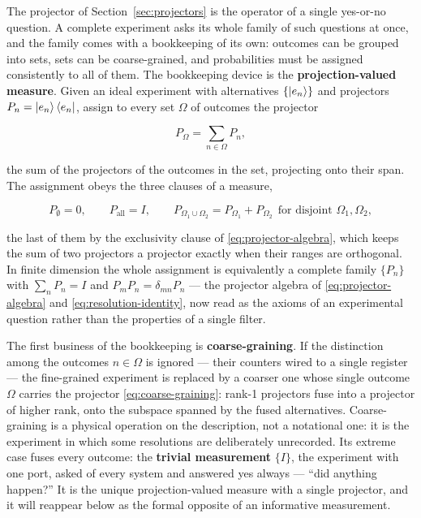 The projector of Section~\ref{sec:projectors} is the operator of a single yes-or-no question. A complete experiment asks its whole family of such questions at once, and the family comes with a bookkeeping of its own: outcomes can be grouped into sets, sets can be coarse-grained, and probabilities must be assigned consistently to all of them. The bookkeeping device is the \textbf{projection-valued measure}. Given an ideal experiment with alternatives $\{\ket{e_n}\}$ and projectors $P_n = \ket{e_n}\bra{e_n}$, assign to every set $\Omega$ of outcomes the projector
\begin{linenomath}
    \begin{equation}
        P_\Omega = \sum_{n\in\Omega} P_n ,
        \label{eq:coarse-graining}
    \end{equation}
\end{linenomath}
the sum of the projectors of the outcomes in the set, projecting onto their span. The assignment obeys the three clauses of a measure,
\begin{linenomath}
    \begin{equation}
        P_{\emptyset} = 0 ,
        \qquad
        P_{\mathrm{all}} = I ,
        \qquad
        P_{\Omega_1\cup\Omega_2} = P_{\Omega_1} + P_{\Omega_2}
        \ \ \text{for disjoint }\Omega_1,\Omega_2 ,
        \label{eq:pvm-axioms}
    \end{equation}
\end{linenomath}
the last of them by the exclusivity clause of \eqref{eq:projector-algebra}, which keeps the sum of two projectors a projector exactly when their ranges are orthogonal. In finite dimension the whole assignment is equivalently a complete family $\{P_n\}$ with $\sum_n P_n = I$ and $P_mP_n = \delta_{mn}P_n$ --- the projector algebra of \eqref{eq:projector-algebra} and \eqref{eq:resolution-identity}, now read as the axioms of an experimental question rather than the properties of a single filter.

The first business of the bookkeeping is \textbf{coarse-graining}. If the distinction among the outcomes $n\in\Omega$ is ignored --- their counters wired to a single register --- the fine-grained experiment is replaced by a coarser one whose single outcome $\Omega$ carries the projector \eqref{eq:coarse-graining}: rank-1 projectors fuse into a projector of higher rank, onto the subspace spanned by the fused alternatives. Coarse-graining is a physical operation on the description, not a notational one: it is the experiment in which some resolutions are deliberately unrecorded. Its extreme case fuses every outcome: the \textbf{trivial measurement} $\{I\}$, the experiment with one port, asked of every system and answered yes always --- ``did anything happen?'' It is the unique projection-valued measure with a single projector, and it will reappear below as the formal opposite of an informative measurement.

